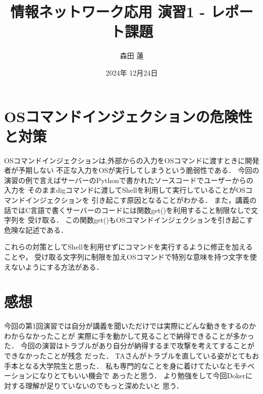 \documentclass{jlreq}
\title{情報ネットワーク応用 演習1 - レポート課題}
\author{森田 蓮}
\date{2024年 12月24日}
\begin{document}
\maketitle

\section{OSコマンドインジェクションの危険性と対策}
OSコマンドインジェクションは,外部からの入力をOSコマンドに渡すときに開発者が予期しない
不正な入力をOSが実行してしまうという脆弱性である．
今回の演習の例で言えばサーバーのPythonで書かれたソースコードでユーザーからの入力を
そのままdigコマンドに渡してShellを利用して実行していることがOSコマンドインジェクションを
引き起こす原因となることがわかる．
また，講義の話ではC言語で書くサーバーのコードには関数get()を利用すること制限なしで文字列を
受け取る．
この関数get()もOSコマンドインジェクションを引き起こす危険な記述である．

これらの対策としてShellを利用せずにコマンドを実行するように修正を加えることや，
受け取る文字列に制限を加えOSコマンドで特別な意味を持つ文字を使えないようにする方法がある．




\section{感想}
今回の第1回演習では自分が講義を聞いただけでは実際にどんな動きをするのかわからなかったことが
実際に手を動かして見ることで納得できることが多かった．
今回の演習はトラブルがあり自分が納得するまで攻撃を考えてすることができなかったことが残念
だった．
TAさんがトラブルを直している姿がとてもお手本となる大学院生と思った．
私も専門的なことを身に着けてたいなとモチベーションになりとてもいい機会で
あったと思う．
より勉強をして今回Dokerに対する理解が足りていないのでもっと深めたいと
思う．
\end{document}
